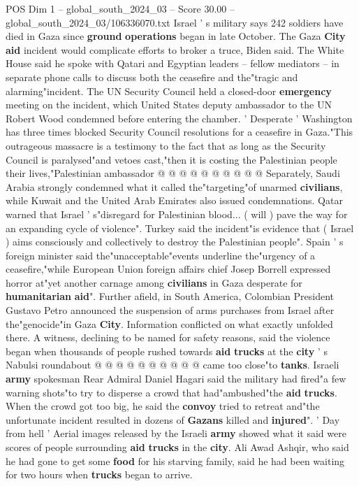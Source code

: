 \begin{textsample}{POS Dim 1 – global\_south\_2024\_03 – Score 30.00 – global\_south\_2024\_03/106336070.txt}
Israel ' s military says 242 soldiers have died in Gaza since \textbf{ground} \textbf{operations} began in late October.
The Gaza \textbf{City} \textbf{aid} incident would complicate efforts to broker a truce, Biden said.
The White House said he spoke with Qatari and Egyptian leaders -- fellow mediators -- in separate phone calls to discuss both the ceasefire and the"tragic and alarming"incident.
The UN Security Council held a closed-door \textbf{emergency} meeting on the incident, which United States deputy ambassador to the UN Robert Wood condemned before entering the chamber. ' Desperate ' Washington has three times blocked Security Council resolutions for a ceasefire in Gaza."This outrageous massacre is a testimony to the fact that as long as the Security Council is paralysed"and vetoes cast,"then it is costing the Palestinian people their lives,"Palestinian ambassador @ @ @ @ @ @ @ @ @ @ Separately, Saudi Arabia strongly condemned what it called the"targeting"of unarmed \textbf{civilians}, while Kuwait and the United Arab Emirates also issued condemnations.
Qatar warned that Israel ' s"disregard for Palestinian blood... ( will ) pave the way for an expanding cycle of violence".
Turkey said the incident"is evidence that ( Israel ) aims consciously and collectively to destroy the Palestinian people".
Spain ' s foreign minister said the"unacceptable"events underline the"urgency of a ceasefire,"while European Union foreign affairs chief Josep Borrell expressed horror at"yet another carnage among \textbf{civilians} in Gaza desperate for \textbf{humanitarian} \textbf{aid}".
Further afield, in South America, Colombian President Gustavo Petro announced the suspension of arms purchases from Israel after the"genocide"in Gaza \textbf{City}.
Information conflicted on what exactly unfolded there.
A witness, declining to be named for safety reasons, said the violence began when thousands of people rushed towards \textbf{aid} \textbf{trucks} at the \textbf{city} ' s Nabulsi roundabout @ @ @ @ @ @ @ @ @ @ came too close"to \textbf{tanks}.
Israeli \textbf{army} spokesman Rear Admiral Daniel Hagari said the military had fired"a few warning shots"to try to disperse a crowd that had"ambushed"the \textbf{aid} \textbf{trucks}.
When the crowd got too big, he said the \textbf{convoy} tried to retreat and"the unfortunate incident resulted in dozens of \textbf{Gazans} killed and \textbf{injured}". ' Day from hell ' Aerial images released by the Israeli \textbf{army} showed what it said were scores of people surrounding \textbf{aid} \textbf{trucks} in the \textbf{city}.
Ali Awad Ashqir, who said he had gone to get some \textbf{food} for his starving family, said he had been waiting for two hours when \textbf{trucks} began to arrive.

\end{textsample}
